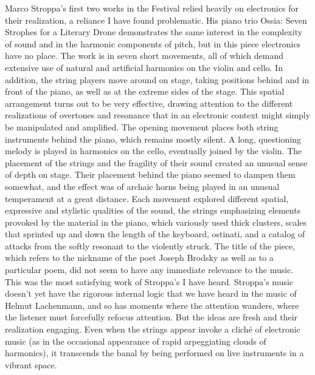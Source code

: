 Marco Stroppa’s first two works in the Festival relied heavily on electronics for their realization, a reliance I have found problematic. His piano trio Ossia: Seven Strophes for a Literary Drone demonstrates the same interest in the complexity of sound and in the harmonic components of pitch, but in this piece electronics have no place. The work is in seven short movements, all of which demand extensive use of natural and artificial harmonics on the violin and cello. In addition, the string players move around on stage, taking positions behind and in front of the piano, as well as at the extreme sides of the stage. This spatial arrangement turns out to be very effective, drawing attention to the different realizations of overtones and resonance that in an electronic context might simply be manipulated and amplified. The opening movement places both string instruments behind the piano, which remains mostly silent. A long, questioning melody is played in harmonics on the cello, eventually joined by the violin. The placement of the strings and the fragility of their sound created an unusual sense of depth on stage. Their placement behind the piano seemed to dampen them somewhat, and the effect was of archaic horns being played in an unusual temperament at a great distance. Each movement explored different spatial, expressive and stylistic qualities of the sound, the strings emphasizing elements provoked by the material in the piano, which variously used thick clusters, scales that sprinted up and down the length of the keyboard, ostinati, and a catalog of attacks from the softly resonant to the violently struck. The title of the piece, which refers to the nickname of the poet Joseph Brodsky as well as to a particular poem, did not seem to have any immediate relevance to the music. This was the most satisfying work of Stroppa’s I have heard. Stroppa’s music doesn’t yet have the rigorous internal logic that we have heard in the music of Helmut Lachenmann, and so has moments where the attention wanders, where the listener must forcefully refocus attention. But the ideas are fresh and their realization engaging. Even when the strings appear invoke a cliché of electronic music (as in the occasional appearance of rapid arpeggiating clouds of harmonics), it transcends the banal by being performed on live instruments in a vibrant space.

